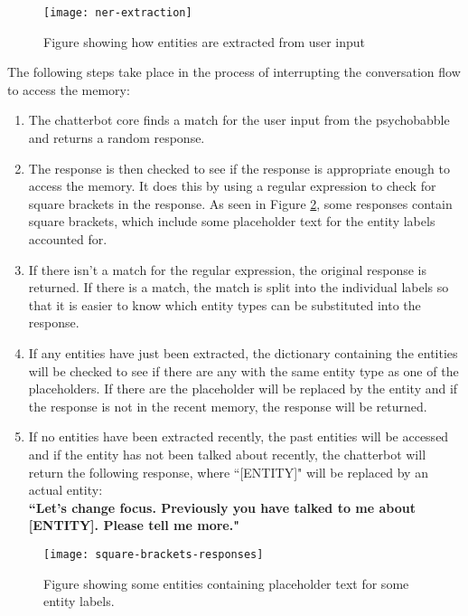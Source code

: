 \begin{figure}[h]
	\centering
	\texttt{[image: ner-extraction]}
	\caption{Figure showing how entities are extracted from user input}
	\label{fig:ner-extraction}
\end{figure}
\noindent
The following steps take place in the process of interrupting the conversation flow to access the memory:
\begin{enumerate}
	\item The chatterbot core finds a match for the user input from the psychobabble and returns a random response.
	\item The response is then checked to see if the response is appropriate enough to access the memory. It does this by using a regular expression to check for square brackets in the response. As seen in Figure \ref{fig:square-brackets-responses}, some responses contain square brackets, which include some placeholder text for the entity labels accounted for.\\
	\item If there isn't a match for the regular expression, the original response is returned. If there is a match, the match is split into the individual labels so that it is easier to know which entity types can be substituted into the response.
	\item If any entities have just been extracted, the dictionary containing the entities will be checked to see if there are any with the same entity type as one of the placeholders. If there are the placeholder will be replaced by the entity and if the response is not in the recent memory, the response will be returned.
	\item If no entities have been extracted recently, the past entities will be accessed and if the entity has not been talked about recently, the chatterbot will return the following response, where ``[ENTITY]" will be replaced by an actual entity:\\
	\textbf{``Let's change focus. Previously you have talked to me about [ENTITY]. Please tell me more."}
\end{enumerate}
\begin{figure}[h]
	\centering
	\texttt{[image: square-brackets-responses]}
	\caption{Figure showing some entities containing placeholder text for some entity labels.}
	\label{fig:square-brackets-responses}
\end{figure}


